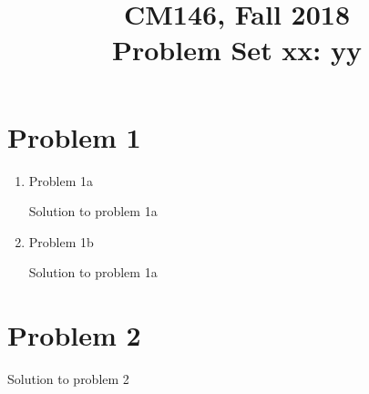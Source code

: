 \documentclass[11pt]{article}
\newcommand{\cnum}{CM146}
\newcommand{\ced}{Fall 2018}
\newcommand{\ctitle}[3]{\title{\vspace{-0.5in}\cnum, \ced\\Problem Set #1: #2}}
\newcommand{\solution}[1]{{{\color{blue}{\bf Solution:} {#1}}}}
\begin{document}
\ctitle{xx}{yy}
\author{}
\date{}
\maketitle
\vspace{-0.75in}

\section{Problem 1}
\begin{enumerate}
\item Problem 1a

\solution{Solution to problem 1a}

\vspace{10cm}
\item Problem 1b

\solution{Solution to problem 1a}
\end{enumerate}

\newpage
\section{Problem 2}

\solution{Solution to problem 2}
\newpage
\end{document}
